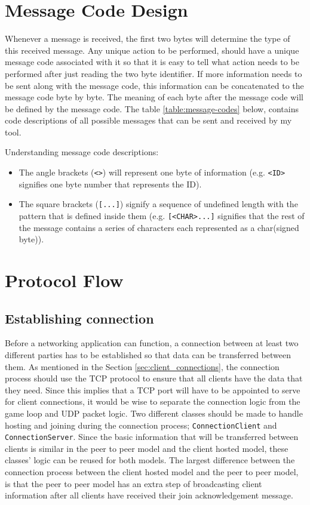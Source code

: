 \section{Message Code Design}
Whenever a message is received, the first two bytes will determine the type of this received message. Any unique action to be performed, should have a unique message code associated with it so that it is easy to tell what action needs to be performed after just reading the two byte identifier. If more information needs to be sent along with the message code, this information can be concatenated to the message code byte by byte. The meaning of each byte after the message code will be defined by the message code. The table \ref{table:message-codes} below, contains code descriptions of all possible messages that can be sent and received by my tool.

Understanding message code descriptions:
\begin{itemize}
\item The angle brackets (\lstinline{<>}) will represent one byte of information (e.g. \lstinline{<ID>} signifies one byte number that represents the ID).
\item The square brackets (\lstinline{[...]}) signify a sequence of undefined length with the pattern that is defined inside them (e.g. \lstinline{[<CHAR>...]} signifies that the rest of the message contains a series of characters each represented as a char(signed byte)).
\end{itemize}
\vfill


\newpage

\section{Protocol Flow}

\subsection{Establishing connection}
Before a networking application can function, a connection between at least two different parties has to be established so that data can be transferred between them. As mentioned in the Section \ref{sec:client_connections}, the connection process should use the TCP protocol to ensure that all clients have the data that they need. Since this implies that a TCP port will have to be appointed to serve for client connections, it would be wise to separate the connection logic from the game loop and UDP packet logic.
Two different classes should be made to handle hosting and joining during the connection process; \lstinline{ConnectionClient} and \lstinline{ConnectionServer}. Since the basic information that will be transferred between clients is similar in the peer to peer model and the client hosted model, these classes' logic can be reused for both models. The largest difference between the connection process between the client hosted model and the peer to peer model, is that the peer to peer model has an extra step of broadcasting client information after all clients have received their join acknowledgement message.

